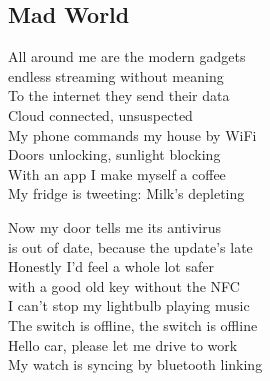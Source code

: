 \subsection{Mad World}

 All around me are the modern gadgets \\
endless streaming without meaning \\
 To the internet they send their data \\
Cloud connected, unsuspected \\

My phone commands my house by WiFi \\
Doors unlocking, sunlight blocking \\
With an app I make myself a coffee \\
My fridge is tweeting: \glqq Milk’s depleting\grqq \\


Now my door tells me its antivirus \\
is out of date, because the update’s late \\
Honestly I’d feel a whole lot safer \\
with a good old key without the NFC \\

I can't stop my lightbulb playing music \\
The switch is offline, the switch is offline \\
Hello car, please let me drive to work \\
My watch is syncing by bluetooth linking \\



